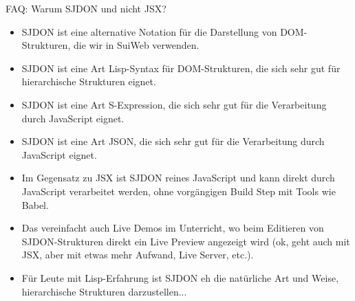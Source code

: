 \begin{example2}{FAQ: Warum SJDON und nicht JSX?}
    \begin{itemize}
        \item SJDON ist eine alternative Notation für die Darstellung von DOM-Strukturen, die wir in SuiWeb verwenden.
        \item SJDON ist eine Art Lisp-Syntax für DOM-Strukturen, die sich sehr gut für hierarchische Strukturen eignet.
        \item SJDON ist eine Art S-Expression, die sich sehr gut für die Verarbeitung durch JavaScript eignet.
        \item SJDON ist eine Art JSON, die sich sehr gut für die Verarbeitung durch JavaScript eignet.
        \item Im Gegensatz zu JSX ist SJDON reines JavaScript und kann direkt durch JavaScript verarbeitet werden, ohne vorgängigen Build Step mit Tools wie Babel.
        \item Das vereinfacht auch Live Demos im Unterricht, wo beim Editieren von SJDON-Strukturen direkt ein Live Preview angezeigt wird (ok, geht auch mit JSX, aber mit etwas mehr Aufwand, Live Server, etc.).
        \item Für Leute mit Lisp-Erfahrung ist SJDON eh die natürliche Art und Weise, hierarchische Strukturen darzustellen...
    \end{itemize}
\end{example2}